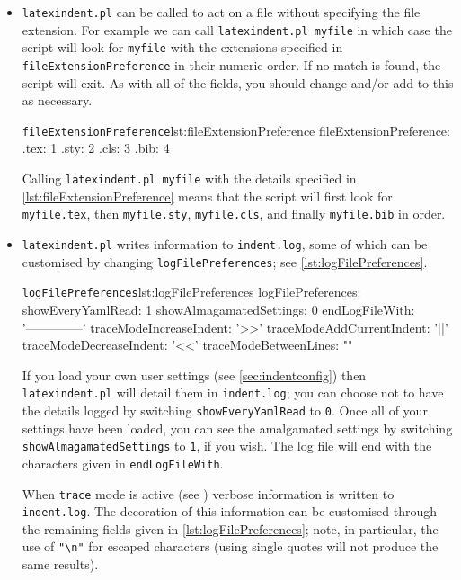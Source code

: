 \documentclass[11pt]{article}
\newcommand{\verbitem}[1]{\small\PVerb{#1}}
\begin{document}
\begin{itemize}
	\item[\verbitem{fileExtensionPreference}] \lstinline!latexindent.pl! can be called to
	      act on a file without
	      specifying the file extension.  For example we can call \lstinline!latexindent.pl myfile!
	      in which case the script will look for \lstinline!myfile! with the extensions
	      specified in \lstinline!fileExtensionPreference! in their numeric order. If
	      no match is found, the script will exit. As with all of the fields, you should
	      change and/or add to this as necessary.
	      \begin{cmhlistings}[style=yaml]{\lstinline!fileExtensionPreference!}{lst:fileExtensionPreference}
fileExtensionPreference:
    .tex: 1
    .sty: 2
    .cls: 3
    .bib: 4
	\end{cmhlistings}
	Calling \lstinline!latexindent.pl myfile! with the details specified in \cref{lst:fileExtensionPreference}
	means that the script will first look for \lstinline!myfile.tex!, then \lstinline!myfile.sty!, \lstinline!myfile.cls!, 
    and finally \lstinline!myfile.bib! in order.
\item[\verbitem{logFilePreferences}] 
  \lstinline!latexindent.pl! writes information to \lstinline!indent.log!, some 
  of which can be customised by changing \lstinline!logFilePreferences!; see \cref{lst:logFilePreferences}.
\begin{cmhlistings}[style=yaml]{\lstinline!logFilePreferences!}{lst:logFilePreferences}
logFilePreferences:
    showEveryYamlRead: 1
    showAlmagamatedSettings: 0
    endLogFileWith: '--------------' 
    traceModeIncreaseIndent: '>>'
    traceModeAddCurrentIndent: '||'
    traceModeDecreaseIndent: '<<'
    traceModeBetweenLines: "\n"
  \end{cmhlistings}
If you load your own user settings (see \vref{sec:indentconfig}) then \lstinline!latexindent.pl! will
detail them in \lstinline!indent.log!; you can choose not to have the details logged by switching
\lstinline!showEveryYamlRead! to \lstinline!0!. Once all of your settings have 
been loaded, you can see the amalgamated settings by switching \lstinline!showAlmagamatedSettings! 
to \lstinline!1!, if you wish. The log file will end with the characters 
given in \lstinline!endLogFileWith!.

When \lstinline!trace! mode is active (see ) verbose information is written 
to \lstinline!indent.log!. The decoration of this information can be customised through the remaining
fields given in \cref{lst:logFilePreferences}; note, in particular, the use of \lstinline!"\n"! for 
escaped characters (using single quotes will not produce the same results).


\end{itemize}
\end{document}
